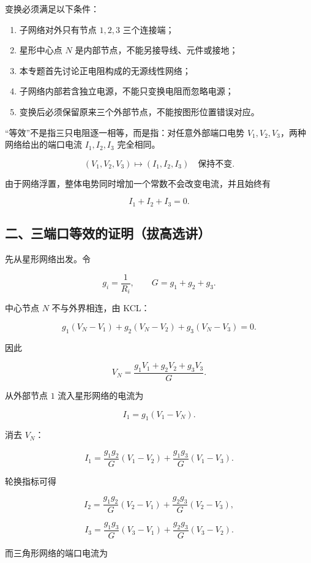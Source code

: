 变换必须满足以下条件：

\begin{enumerate}
\def\labelenumi{\arabic{enumi}.}
\tightlist
\item
  子网络对外只有节点 \(1,2,3\) 三个连接端；
\item
  星形中心点 \(N\) 是内部节点，不能另接导线、元件或接地；
\item
  本专题首先讨论正电阻构成的无源线性网络；
\item
  子网络内部若含独立电源，不能只变换电阻而忽略电源；
\item
  变换后必须保留原来三个外部节点，不能按图形位置错误对应。
\end{enumerate}

``等效''不是指三只电阻逐一相等，而是指：对任意外部端口电势
\(V_1,V_2,V_3\)，两种网络给出的端口电流 \(I_1,I_2,I_3\) 完全相同。

\[
\boxed{
(V_1,V_2,V_3)\longmapsto(I_1,I_2,I_3)
\quad\text{保持不变}
}.
\]

由于网络浮置，整体电势同时增加一个常数不会改变电流，并且始终有

\[
I_1+I_2+I_3=0.
\]

\subsection{二、三端口等效的证明（拔高选讲）}\label{m4:ux4e8cux4e09ux7aefux53e3ux7b49ux6548ux7684ux8bc1ux660eux62d4ux9ad8ux9009ux8bb2}

先从星形网络出发。令

\[
g_i=\frac1{R_i},
\qquad
G=g_1+g_2+g_3.
\]

中心节点 \(N\) 不与外界相连，由 KCL：

\[
g_1(V_N-V_1)+g_2(V_N-V_2)+g_3(V_N-V_3)=0.
\]

因此

\[
\boxed{
V_N=\frac{g_1V_1+g_2V_2+g_3V_3}{G}
}.
\]

从外部节点 \(1\) 流入星形网络的电流为

\[
I_1=g_1(V_1-V_N).
\]

消去 \(V_N\)：

\[
I_1
=\frac{g_1g_2}{G}(V_1-V_2)
+\frac{g_1g_3}{G}(V_1-V_3).
\]

轮换指标可得

\[
I_2
=\frac{g_1g_2}{G}(V_2-V_1)
+\frac{g_2g_3}{G}(V_2-V_3),
\]

\[
I_3
=\frac{g_1g_3}{G}(V_3-V_1)
+\frac{g_2g_3}{G}(V_3-V_2).
\]

而三角形网络的端口电流为

